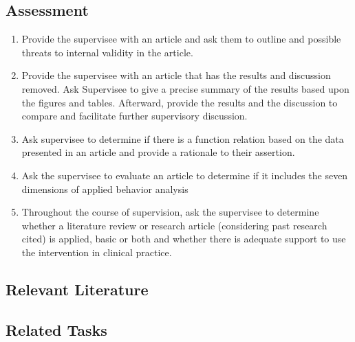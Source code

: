 \subsection{Assessment}
\begin{enumerate}
\item Provide the supervisee with an article and ask them to outline and possible threats to internal validity in the article. 
\item Provide the supervisee with an article that has the results and discussion removed. Ask Supervisee to give a precise summary of the results based upon the figures and tables. Afterward, provide the results and the discussion to compare and facilitate further supervisory discussion. 
\item Ask supervisee to determine if there is a function relation based on the data presented in an article and provide a rationale to their assertion. 
\item Ask the supervisee to evaluate an article to determine if it includes the seven dimensions of applied behavior analysis
\item Throughout the course of supervision, ask the supervisee to determine whether a literature review or research article (considering past research cited) is applied, basic or both and whether there is adequate support to use the intervention in clinical practice. 
\end{enumerate}
%
\subsection{Relevant Literature}
\begin{refsection}
\nocite{test,alang2017police,clayton2018black}
\printbibliography[heading=none]
\end{refsection}
%
\subsection{Related Tasks} 
\fourbOne{}\\
\fourhFour{}\\
\fouriFive{}\\
\fourFKFour{}\\
\fourFKNine{}\\
\fourFKThirtyThree{}\\
%
%
%
%

